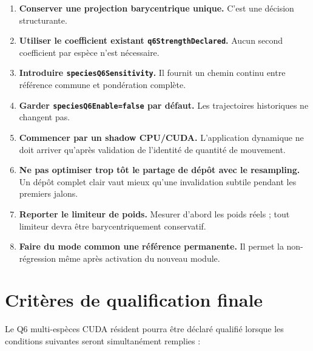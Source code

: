 \documentclass[11pt,a4paper]{article}
\newcommand{\code}[1]{\texttt{#1}}
\begin{document}
\begin{enumerate}
  \item \textbf{Conserver une projection barycentrique unique.} C'est une décision structurante.
  \item \textbf{Utiliser le coefficient existant \code{q6StrengthDeclared}.} Aucun second coefficient par espèce n'est nécessaire.
  \item \textbf{Introduire \code{speciesQ6Sensitivity}.} Il fournit un chemin continu entre référence commune et pondération complète.
  \item \textbf{Garder \code{speciesQ6Enable=false} par défaut.} Les trajectoires historiques ne changent pas.
  \item \textbf{Commencer par un shadow CPU/CUDA.} L'application dynamique ne doit arriver qu'après validation de l'identité de quantité de mouvement.
  \item \textbf{Ne pas optimiser trop tôt le partage de dépôt avec le resampling.} Un dépôt complet clair vaut mieux qu'une invalidation subtile pendant les premiers jalons.
  \item \textbf{Reporter le limiteur de poids.} Mesurer d'abord les poids réels ; tout limiteur devra être barycentriquement conservatif.
  \item \textbf{Faire du mode common une référence permanente.} Il permet la non-régression même après activation du nouveau module.
\end{enumerate}

\section{Critères de qualification finale}

Le Q6 multi-espèces CUDA résident pourra être déclaré qualifié lorsque les conditions suivantes seront simultanément remplies :
\end{document}
